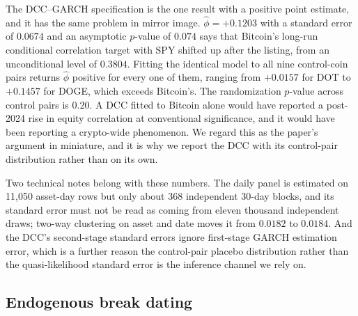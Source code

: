 \documentclass[12pt,a4paper]{article}
\begin{document}


The DCC--GARCH specification is the one result with a positive point estimate, and it has the same problem in mirror image.
$\hat\phi = +0.1203$ with a standard error of $0.0674$ and an asymptotic $p$-value of
$0.074$ says that Bitcoin's long-run conditional correlation target with SPY shifted up after the listing, from an unconditional level of
$0.3804$. Fitting the identical model to all nine control-coin pairs returns $\hat\phi$ positive for every one of them, ranging from
$+0.0157$ for DOT to
$+0.1457$ for DOGE, which exceeds Bitcoin's. The randomization $p$-value across control pairs is
$0.20$. A DCC fitted to Bitcoin alone would have reported a post-2024 rise in equity correlation at conventional significance, and it would have been reporting a crypto-wide phenomenon. We regard this as the paper's argument in miniature, and it is why we report the DCC with its control-pair distribution rather than on its own.



Two technical notes belong with these numbers. The daily panel is estimated on
11{,}050 asset-day rows but only about
368 independent 30-day blocks, and its standard error must not be read as coming from eleven thousand independent draws; two-way clustering on asset and date moves it from
$0.0182$ to $0.0184$. And the DCC's second-stage standard errors ignore first-stage GARCH estimation error, which is a further reason the control-pair placebo distribution rather than the quasi-likelihood standard error is the inference channel we rely on.

\subsection{Endogenous break dating}
\end{document}
